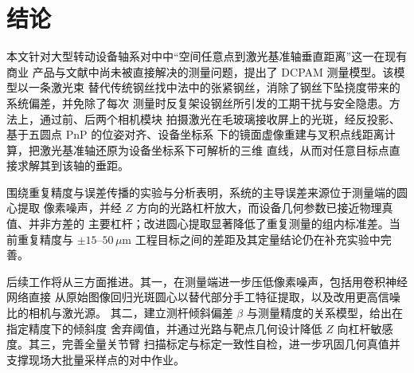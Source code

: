\section{结论}
\label{sec:conclusion}

本文针对大型转动设备轴系对中中“空间任意点到激光基准轴垂直距离”这一在现有商业
产品与文献中尚未被直接解决的测量问题，提出了 DCPAM 测量模型。该模型以一条激光束
替代传统钢丝找中法中的张紧钢丝，消除了钢丝下坠挠度带来的系统偏差，并免除了每次
测量时反复架设钢丝所引发的工期干扰与安全隐患。方法上，通过前、后两个相机模块
拍摄激光在毛玻璃接收屏上的光斑，经反投影、基于五圆点 PnP 的位姿对齐、设备坐标系
下的镜面虚像重建与叉积点线距离计算，把激光基准轴还原为设备坐标系下可解析的三维
直线，从而对任意目标点直接求解其到该轴的垂距。

围绕重复精度与误差传播的实验与分析表明，系统的主导误差来源位于测量端的圆心提取
像素噪声，并经 $Z$ 方向的光路杠杆放大，而设备几何参数已接近物理真值、并非方差的
主要杠杆；改进圆心提取显著降低了重复测量的组内标准差。当前重复精度与
$\pm15$--$50\,\mu\mathrm{m}$ 工程目标之间的差距及其定量结论仍在补充实验中完善。

后续工作将从三方面推进。其一，在测量端进一步压低像素噪声，包括用卷积神经网络直接
从原始图像回归光斑圆心以替代部分手工特征提取，以及改用更高信噪比的相机与激光源。
其二，建立测杆倾斜偏差 $\beta$ 与测量精度的关系模型，给出在指定精度下的倾斜度
舍弃阈值，并通过光路与靶点几何设计降低 $Z$ 向杠杆敏感度。其三，完善全量关节臂
扫描标定与标定一致性自检，进一步巩固几何真值并支撑现场大批量采样点的对中作业。
